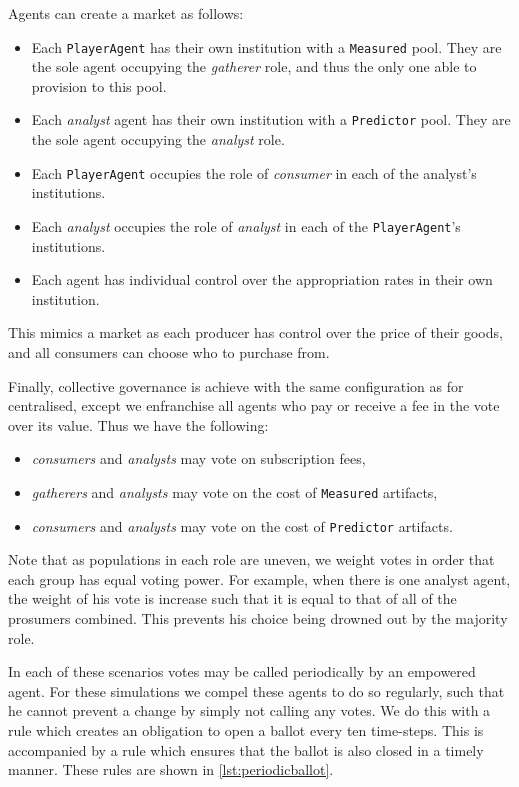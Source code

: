 Agents can create a market as follows:

\begin{itemize}
\item Each \texttt{PlayerAgent} has their own institution with a \texttt{Measured} pool. They are the sole agent occupying the \emph{gatherer} role, and thus the only one able to provision to this pool.
\item Each \emph{analyst} agent has their own institution with a \texttt{Predictor} pool. They are the sole agent occupying the \emph{analyst} role.
\item Each \texttt{PlayerAgent} occupies the role of \emph{consumer} in each of the analyst's institutions.
\item Each \emph{analyst} occupies the role of \emph{analyst} in each of the \texttt{PlayerAgent}'s institutions.
\item Each agent has individual control over the appropriation rates in their own institution.
\end{itemize}

This mimics a market as each producer has control over the price of their goods, and all consumers can choose who to purchase from.

Finally, collective governance is achieve with the same configuration as for centralised, except we enfranchise all agents who pay or receive a fee in the vote over its value. Thus we have the following:

\begin{itemize}
\item \emph{consumers} and \emph{analysts} may vote on subscription fees,
\item \emph{gatherers} and \emph{analysts} may vote on the cost of \texttt{Measured} artifacts,
\item \emph{consumers} and \emph{analysts} may vote on the cost of \texttt{Predictor} artifacts.
\end{itemize}

Note that as populations in each role are uneven, we weight votes in order
that each group has equal voting power. For example, when there is one analyst
agent, the weight of his vote is increase such that it is equal to that of all
of the prosumers combined. This prevents his choice being drowned out by the
majority role.

In each of these scenarios votes may be called periodically by an empowered
agent. For these simulations we compel these agents to do so regularly, such
that he cannot prevent a change by simply not calling any votes. We do this
with a rule which creates an obligation to open a ballot every ten time-steps.
This is accompanied by a  rule which ensures that the ballot is also closed in
a timely manner. These rules are shown in \autoref{lst:periodicballot}.

